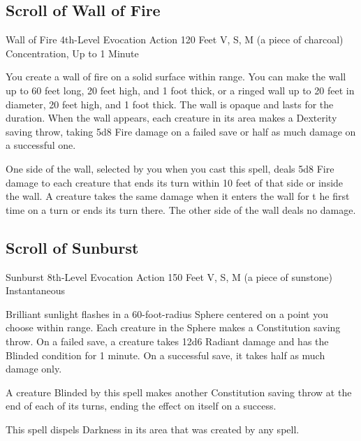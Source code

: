 \documentclass[letterpaper,openany,oneside,twocolumn]{book}
\begin{document}
\subsection*{Scroll of Wall of Fire}
\DndSpellHeader
  {Wall of Fire}
  {4th-Level Evocation}
  {Action}
  {120 Feet}
  {V, S, M (a piece of charcoal)}
  {Concentration, Up to 1 Minute}

You create a wall of fire on a solid surface within range. You can make the wall up to 60 feet long, 20 feet high, and 1 foot thick, or a ringed wall up to 20 feet in diameter, 20 feet high, and 1 foot thick. The wall is opaque and lasts for the duration.
When the wall appears, each creature in its area makes a Dexterity saving throw, taking 5d8 Fire damage on a failed save or half as much damage on a successful one.

One side of the wall, selected by you when you cast this spell, deals 5d8 Fire damage to each creature that ends its turn within 10 feet of that side or inside the wall. A creature takes the same damage when it enters the wall for t he first time on a turn or ends its turn there. The other side of the wall deals no damage.
\vfill\eject
\subsection*{Scroll of Sunburst}
\DndSpellHeader
  {Sunburst}
  {8th-Level Evocation}
  {Action}
  {150 Feet}
  {V, S, M (a piece of sunstone)}
  {Instantaneous}

Brilliant sunlight flashes in a 60-foot-radius Sphere centered on a point you choose within range. Each
creature in the Sphere makes a Constitution saving throw. On a failed save, a creature takes 12d6 Radiant damage and has the Blinded condition for 1 minute. On a successful save, it takes half as much damage only.

A creature Blinded by this spell makes another Constitution saving throw at the end of each of its turns, ending the effect on itself on a success.

This spell dispels Darkness in its area that was created by any spell.
\end{document}

